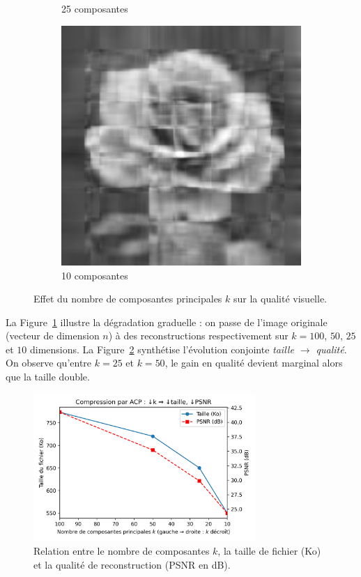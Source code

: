 \documentclass[a4paper,12pt]{report}
\begin{document}
\begin{figure}[H]
\begin{subfigure}{0.18\textwidth}
    \caption*{25 composantes}
  \end{subfigure}\hfill
  \begin{subfigure}{0.18\textwidth}
    \includegraphics[width=\linewidth]{images/pca_10.png}
    \caption*{10 composantes}
  \end{subfigure}
  \caption{Effet du nombre de composantes principales \(k\) sur la qualité visuelle.}
  \label{fig:acp_degraded}
\end{figure}

La Figure~\ref{fig:acp_degraded} illustre la dégradation graduelle : on passe
de l’image originale (vecteur de dimension \(n\)) à des reconstructions
respectivement sur \(k=100\), \(50\), \(25\) et \(10\) dimensions.  
La Figure~\ref{fig:acp_curve} synthétise l’évolution conjointe
\emph{taille \(\rightarrow\) qualité}. On observe qu’entre \(k=25\) et \(k=50\),
le gain en qualité devient marginal alors que la taille double.

\begin{figure}[H]
  \centering
    
  \includegraphics[width=0.75\textwidth]{images/pca_storage_vs_quality.png}
  \caption{Relation entre le nombre de composantes \(k\), la taille de fichier
           (Ko) et la qualité de reconstruction (PSNR en dB).}
  \label{fig:acp_curve}
\end{figure}
\end{document}
